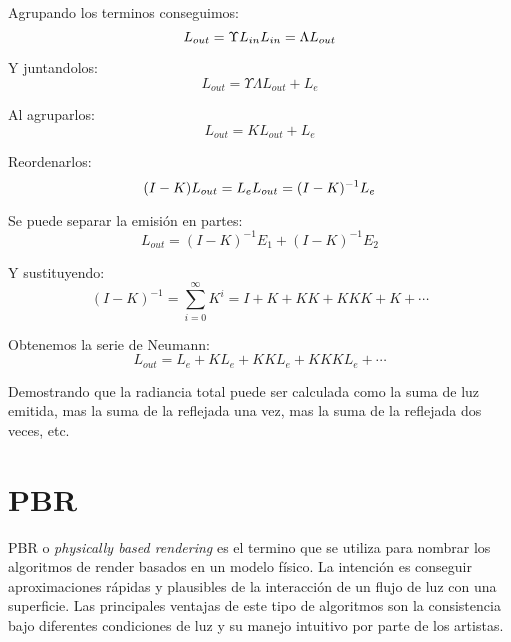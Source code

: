     Agrupando los terminos conseguimos:
    \begin{equation}
        L_{out} = \Upsilon L_{in}\\
        L_{in} = \Lambda L_{out}
    \end{equation}
    \singlespacing

    Y juntandolos:
    \begin{equation}
        L_{out} = \Upsilon\Lambda L_{out} + L_e
    \end{equation}
    \singlespacing

    Al agruparlos:
    \begin{equation}
        L_{out} = K L_{out} + L_e
    \end{equation}
    \singlespacing

    Reordenarlos:
    \begin{equation}
        (I-K)L_{out} = L_e\\
        L_{out} = (I - K)^{-1}L_e
    \end{equation}
    \singlespacing

    Se puede separar la emisi\'on en partes:
    \begin{equation}
        L_{out} = (I - K)^{-1}E_1 + (I-K)^{-1}E_2
    \end{equation}
    \singlespacing

    Y sustituyendo:
    \begin{equation}
        (I - K)^{-1} = \sum_{i=0}^{\infty}K^i = I + K + KK + KKK + K + \dotsi
    \end{equation}
    \singlespacing

    Obtenemos la serie de Neumann:
    \begin{equation}
        L_{out} = L_e + KL_e + KKL_e + KKKL_e + \dotsi
    \end{equation}
    \singlespacing

    Demostrando que la radiancia total puede ser calculada como la suma de luz emitida, mas la suma de la reflejada una vez,
    mas la suma de la reflejada dos veces, etc.

\section{PBR}
    PBR o \textit{physically based rendering} es el termino que se utiliza para nombrar los algoritmos de render basados en un modelo f\'isico.
    La intenci\'on es conseguir aproximaciones r\'apidas y plausibles de la interacci\'on de un flujo de luz con una superficie. Las
    principales ventajas de este tipo de algoritmos son la consistencia bajo diferentes condiciones de luz y su manejo intuitivo por
    parte de los artistas.

